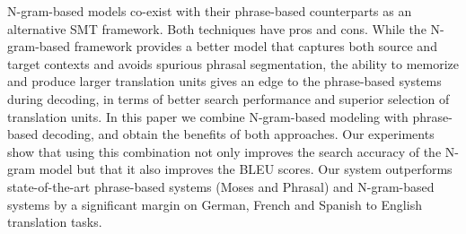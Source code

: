 N-gram-based models co-exist with their phrase-based counterparts as an alternative SMT framework. Both techniques have pros and cons. While the
 N-gram-based framework provides a better model that captures both source and
 target contexts and avoids spurious phrasal segmentation, the ability to
 memorize and produce larger translation units gives an edge to the phrase-based
 systems during decoding, in terms of better search performance and superior
 selection of translation units. In this paper we combine N-gram-based modeling
 with phrase-based decoding, and obtain the benefits of both approaches. Our
 experiments show that using this combination not only improves the search
 accuracy of the N-gram model but that it also improves the BLEU scores. Our
 system outperforms state-of-the-art phrase-based systems (Moses and Phrasal)
 and N-gram-based systems by a significant margin on German, French and Spanish
 to English translation tasks.

